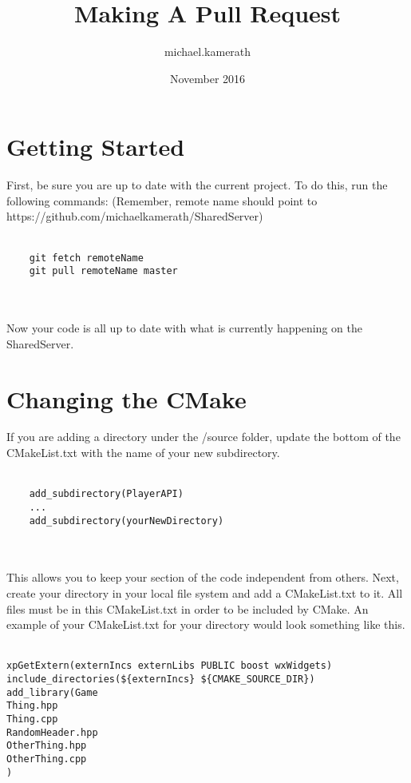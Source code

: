 \documentclass{article}
\title{Making A Pull Request}
\author{michael.kamerath }
\date{November 2016}
\begin{document}
\maketitle

\section{Getting Started}
First, be sure you are up to date with the current project. To do this, run the following commands: (Remember, remote name should point to \\ https://github.com/michaelkamerath/SharedServer) \\ \\
\begin{verbatim}
    git fetch remoteName
    git pull remoteName master
\end{verbatim}
\\ \\
Now your code is all up to date with what is currently happening on the SharedServer.

\section{Changing the CMake}
If you are adding a directory under the /source folder, update the bottom of the CMakeList.txt with the name of your new subdirectory. \\ \\
\begin{verbatim}
    add_subdirectory(PlayerAPI)
    ...
    add_subdirectory(yourNewDirectory)
\end{verbatim}
\\ \\
This allows you to keep your section of the code independent from others. Next, create your directory in your local file system and add a CMakeList.txt to it. All files must be in this CMakeList.txt in order to be included by CMake. An example of your CMakeList.txt for your directory would look something like this. \\ \\
\begin{verbatim}
xpGetExtern(externIncs externLibs PUBLIC boost wxWidgets)
include_directories(${externIncs} ${CMAKE_SOURCE_DIR})
add_library(Game
Thing.hpp
Thing.cpp
RandomHeader.hpp
OtherThing.hpp
OtherThing.cpp
)
\end{verbatim}
\end{document}
